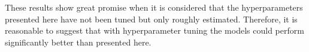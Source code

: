 \documentclass[11pt]{article}
\begin{document}
These results show great promise when it is considered that the hyperparameters presented here have not been tuned but only roughly estimated. Therefore, it is reasonable to suggest that with hyperparameter tuning the models could perform significantly better than presented here.



\end{document}
